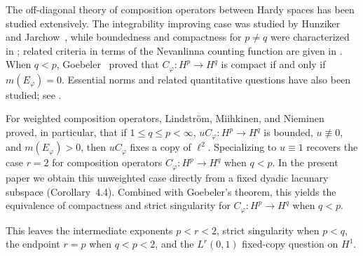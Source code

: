 \documentclass[11pt, reqno]{amsart}
\theoremstyle{definition}
\theoremstyle{remark}
\begin{document}
 
The off-diagonal theory of composition operators between Hardy spaces
has been studied extensively. The integrability improving case was
studied by Hunziker and Jarchow~\cite{HunzikerJarchow1991}, while
boundedness and compactness for \(p\ne q\) were characterized in
\cite{ContrerasHernandezDiaz2003,BlascoJarchow2005}; related criteria in terms of the Nevanlinna counting function are
given in \cite{PerezGonzalezRattyaVukotic2007}. When \(q<p\),
Goebeler~\cite[Corollary~5, p.~390]{Goebeler2001} proved that
\(C_\varphi:H^p\to H^q\) is compact if and only if
\(m(E_\varphi)=0\). Essential norms and related quantitative questions
have also been studied; see
\cite{GorkinMacCluer2004,Demazeux2011,ShiLi2018,Bayart2024}.

For weighted composition operators, Lindstr\"om, Miihkinen, and
Nieminen~\cite{LindstromMiihkinenNieminen2020} proved, in particular,
that if \(1\le q\le p<\infty\), \(uC_\varphi:H^p\to H^q\) is bounded,
\(u\not\equiv0\), and \(m(E_\varphi)>0\), then \(uC_\varphi\) fixes a
copy of \(\ell^2\). Specializing to $u\equiv1$ recovers the case
$r=2$ for composition operators $C_{\varphi}:H^{p}\to H^{q}$ when $q<p$.
In the present paper we obtain this unweighted case directly from a fixed
dyadic lacunary subspace (Corollary~4.4). Combined with Goebeler's theorem,
this yields the equivalence of compactness and strict singularity for
$C_{\varphi}:H^{p}\to H^{q}$ when $q<p$.
 

This leaves the intermediate exponents \(p<r<2\), strict
singularity when \(p<q\), the endpoint \(r=p\) when \(q<p<2\),
and the \(L^r(0,1)\) fixed-copy question on \(H^1\).
 
\end{document}
